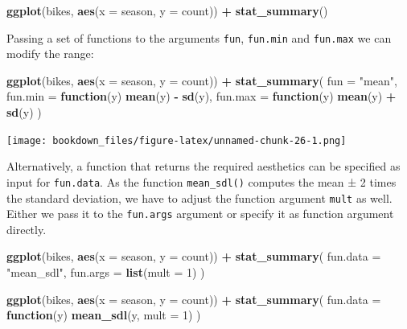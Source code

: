 \documentclass[
]{krantz}
\makeatletter
\newenvironment{Shaded}{\begin{snugshade}}{\end{snugshade}}
\newcommand{\AttributeTok}[1]{\textcolor[rgb]{0.27,0.27,0.27}{#1}}
\newcommand{\ControlFlowTok}[1]{\textcolor[rgb]{0.27,0.27,0.27}{\textbf{#1}}}
\newcommand{\DecValTok}[1]{\textcolor[rgb]{0.06,0.06,0.06}{#1}}
\newcommand{\FunctionTok}[1]{\textcolor[rgb]{0.27,0.27,0.27}{\textbf{#1}}}
\newcommand{\NormalTok}[1]{#1}
\newcommand{\SpecialCharTok}[1]{\textcolor[rgb]{0.43,0.43,0.43}{\textbf{#1}}}
\newcommand{\StringTok}[1]{\textcolor[rgb]{0.5,0.5,0.5}{#1}}
\newenvironment{kframe}{%
\medskip{}
\setlength{\fboxsep}{.8em}
 \def\at@end@of@kframe{}%
 \ifinner\ifhmode%
  \def\at@end@of@kframe{\end{minipage}}%
  \begin{minipage}{\columnwidth}%
 \fi\fi%
 \def\FrameCommand##1{\hskip\@totalleftmargin \hskip-\fboxsep
 \colorbox{shadecolor}{##1}\hskip-\fboxsep
     \hskip-\linewidth \hskip-\@totalleftmargin \hskip\columnwidth}%
 \MakeFramed {\advance\hsize-\width
   \@totalleftmargin\z@ \linewidth\hsize
   \@setminipage}}%
 {\par\unskip\endMakeFramed%
 \at@end@of@kframe}
\renewenvironment{Shaded}{\begin{kframe}}{\end{kframe}}
\makeatother
\begin{document}
\begin{Shaded}
\begin{Highlighting}[]
\FunctionTok{ggplot}\NormalTok{(bikes, }\FunctionTok{aes}\NormalTok{(}\AttributeTok{x =}\NormalTok{ season, }\AttributeTok{y =}\NormalTok{ count)) }\SpecialCharTok{+}
  \FunctionTok{stat\_summary}\NormalTok{()}
\end{Highlighting}
\end{Shaded}

Passing a set of functions to the arguments \texttt{fun}, \texttt{fun.min} and \texttt{fun.max} we can modify the range:

\begin{Shaded}
\begin{Highlighting}[]
\FunctionTok{ggplot}\NormalTok{(bikes, }\FunctionTok{aes}\NormalTok{(}\AttributeTok{x =}\NormalTok{ season, }\AttributeTok{y =}\NormalTok{ count)) }\SpecialCharTok{+}
  \FunctionTok{stat\_summary}\NormalTok{(}
    \AttributeTok{fun =} \StringTok{"mean"}\NormalTok{,}
    \AttributeTok{fun.min =} \ControlFlowTok{function}\NormalTok{(y) }\FunctionTok{mean}\NormalTok{(y) }\SpecialCharTok{{-}} \FunctionTok{sd}\NormalTok{(y), }
    \AttributeTok{fun.max =} \ControlFlowTok{function}\NormalTok{(y) }\FunctionTok{mean}\NormalTok{(y) }\SpecialCharTok{+} \FunctionTok{sd}\NormalTok{(y)}
\NormalTok{  )}
\end{Highlighting}
\end{Shaded}

\texttt{[image: bookdown\_files/figure-latex/unnamed-chunk-26-1.png]}

Alternatively, a function that returns the required aesthetics can be specified as input for \texttt{fun.data}. As the function \texttt{mean\_sdl()} computes the mean ± 2 times the standard deviation, we have to adjust the function argument \texttt{mult} as well. Either we pass it to the \texttt{fun.args} argument or specify it as function argument directly.

\begin{Shaded}
\begin{Highlighting}[]
\FunctionTok{ggplot}\NormalTok{(bikes, }\FunctionTok{aes}\NormalTok{(}\AttributeTok{x =}\NormalTok{ season, }\AttributeTok{y =}\NormalTok{ count)) }\SpecialCharTok{+}
  \FunctionTok{stat\_summary}\NormalTok{(}
    \AttributeTok{fun.data =} \StringTok{"mean\_sdl"}\NormalTok{, }
    \AttributeTok{fun.args =} \FunctionTok{list}\NormalTok{(}\AttributeTok{mult =} \DecValTok{1}\NormalTok{)}
\NormalTok{  )}

\FunctionTok{ggplot}\NormalTok{(bikes, }\FunctionTok{aes}\NormalTok{(}\AttributeTok{x =}\NormalTok{ season, }\AttributeTok{y =}\NormalTok{ count)) }\SpecialCharTok{+}
  \FunctionTok{stat\_summary}\NormalTok{(}
    \AttributeTok{fun.data =} \ControlFlowTok{function}\NormalTok{(y) }\FunctionTok{mean\_sdl}\NormalTok{(y, }\AttributeTok{mult =} \DecValTok{1}\NormalTok{)}
\NormalTok{  )}
\end{Highlighting}
\end{Shaded}
\end{document}
